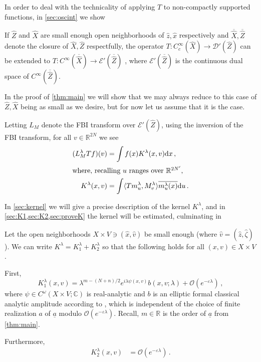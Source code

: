 \documentclass[
	fontsize=11pt, 
	twoside=false, 
	abstract=true, 
	a4paper,
]{scrartcl}
\newcommand{\eps}{\varepsilon}
\newcommand{\RR}{\mathbb{R}}
\newcommand{\CC}{\mathbb{C}}
\newcommand{\dd}{\mathrm{d}}
\newcommand{\ud}[1]{\underline{#1}}
\begin{document}
In order to deal with the technicality of applying $T$ to non-compactly supported functions, in \cref{sec:oscint} we show 
\begin{lemma}\label{cor:bounded}
	If $\hat Z$ and $\hat X$ are small enough open neighborhoods of $\hat z, \hat x$ respectively and $\overline{\hat X}, \overline{\hat Z}$ denote the closure of $\hat X, \hat Z$ respectfully, the operator $T \colon C_c^\infty(\hat X) \to \mathcal{D}'(\hat Z)$ %
	can be extended to $T \colon C^\infty(\overline{\hat X}) \to \mathcal{E}'(\overline{\hat Z})$ %
	, where $\mathcal{E}'(\overline{\hat Z})$ is the continuous dual space of $C^\infty(\overline{\hat Z})$.
\end{lemma}
In the proof of \cref{thm:main} we will show that we may always reduce to this case of $\hat Z, \hat X$ being as small as we desire, but for now let us assume that it is the case.

Letting $L_M$ denote the FBI transform over $\mathcal{E}'(\hat Z)$, using the inversion of the FBI transform, for all $v\in\RR^{2N}$ we see 
\begin{align}
	(L_M^\lambda T f)(v) &= \int f(x)K^\lambda(x,v)\dd x\,, \notag\\
	\shortintertext{where, recalling $u$ ranges over $\RR^{2N'}$,} 
	K^\lambda(x,v) &= \int \langle Tm_{u}^\lambda,M_{v}^\lambda\rangle \overline{m_{u}^\lambda(x)}\dd u\,. \label{eq:defofK}
\end{align}

In \cref{sec:kernel} we will give a precise description of the kernel $K^\lambda$, and in \cref{sec:K1,sec:K2,sec:proveK} the kernel will be estimated, culminating in 
\begin{proposition}\label{prop:Kgood}
	Let the open neighborhoods $X\times V \ni (\hat x,\hat v)$ be small enough (where $\hat v = (\hat z, \hat \zeta)$). We can write $K^\lambda = K_1^\lambda + K_2^\lambda$ so that the following holds for all $(x,v)\in X\times V$.

	First,
	\begin{equation}
		\label{eq:howKsact1} K_1^\lambda(x,v) = \lambda^{m-(N+n)/2}e^{i\lambda\psi(x,v)}b(x,v;\lambda) + \mathcal{O}(e^{-\eps\lambda})\,,
	\end{equation}
	where $\psi\in C^\omega(X\times V;\CC)$ is real-analytic and $b$ is an elliptic formal classical analytic amplitude according to \cite[\S~1]{AST_1982__95__R3_0}, which is independent of the choice of finite realization $a$ of $\ud{a}$ modulo $\mathcal{O}(e^{-\eps\lambda})$. Recall, $m\in \RR$ is the order of $\ud{a}$ from \cref{thm:main}.
	
	Furthermore, %
	\begin{align}
		K_{2}^\lambda(x,v) &= \mathcal{O}(e^{-\eps\lambda})\,.\label{eq:howKsact2}
	\end{align}
\end{proposition}
\end{document}
